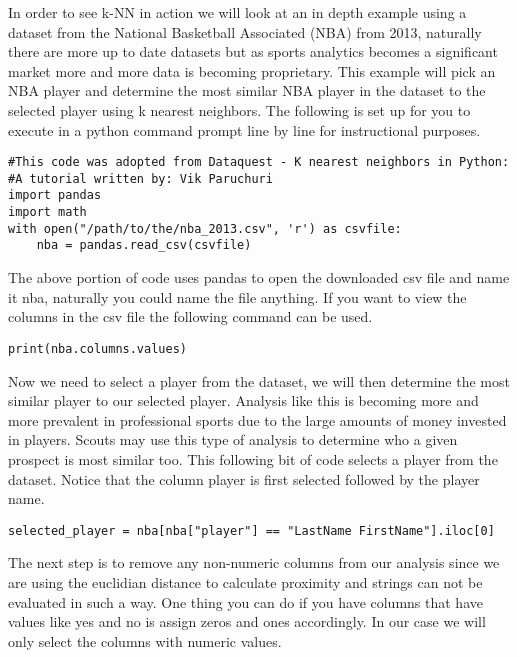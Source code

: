  

In order to see k-NN in action we will look at an in depth example using
a dataset from the National Basketball Associated (NBA) from 2013,
naturally there are more up to date datasets but as sports analytics
becomes a significant market more and more data is becoming
proprietary. This example will pick an NBA player and determine the
most similar NBA player in the dataset to the selected player using
k nearest neighbors. The following is set up for you to execute in a
python command prompt line by line for instructional purposes.  

\begin{lstlisting}
#This code was adopted from Dataquest - K nearest neighbors in Python:
#A tutorial written by: Vik Paruchuri
import pandas
import math
with open("/path/to/the/nba_2013.csv", 'r') as csvfile:
    nba = pandas.read_csv(csvfile)
\end{lstlisting}

The above portion of code uses pandas to open the downloaded csv file
and name it nba, naturally you could name the file anything. If you
want to view the columns in the csv file the following command can be
used.

\begin{lstlisting}
print(nba.columns.values)
\end{lstlisting} 

Now we need to select a player from the dataset, we will then
determine the most similar player to our selected player. Analysis
like this is becoming more and more prevalent in professional sports
due to the large amounts of money invested in players. Scouts may use
this type of analysis to determine who a given prospect is most
similar too. This following bit of code selects a player from the
dataset. Notice that the column player is first selected followed by
the player name.  

\begin{lstlisting}
selected_player = nba[nba["player"] == "LastName FirstName"].iloc[0]
\end{lstlisting} 

The next step is to remove any non-numeric columns from our analysis
since we are using the euclidian distance to calculate proximity and
strings can not be evaluated in such a way. One thing you can do if
you have columns that have values like yes and no is assign zeros and
ones accordingly. In our case we will only select the columns with
numeric values. 

